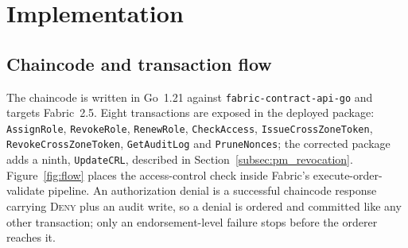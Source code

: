 \documentclass[a4paper,fleqn]{cas-sc}
\begin{document}
\FloatBarrier
\section{Implementation}
\label{sec:impl}

\subsection{Chaincode and transaction flow}
\label{subsec:chaincode}

The chaincode is written in Go~1.21 against \texttt{fabric-contract-api-go}
and targets Fabric~2.5. Eight transactions are exposed in the deployed
package: \texttt{AssignRole}, \texttt{RevokeRole}, \texttt{RenewRole},
\texttt{CheckAccess}, \texttt{IssueCrossZoneToken},
\texttt{RevokeCrossZoneToken}, \texttt{GetAuditLog} and \texttt{PruneNonces};
the corrected package adds a ninth, \texttt{UpdateCRL}, described in
Section~\ref{subsec:pm_revocation}. Figure~\ref{fig:flow} places the
access-control check inside Fabric's execute-order-validate pipeline. An
authorization denial is a successful chaincode response carrying
\textsc{Deny} plus an audit write, so a denial is ordered and committed like
any other transaction; only an endorsement-level failure stops before the
orderer reaches it.
\end{document}
